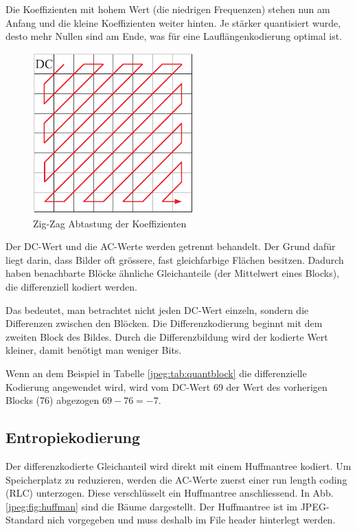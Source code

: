 Die Koeffizienten mit hohem Wert (die niedrigen Frequenzen) stehen nun am Anfang und die kleine Koeffizienten weiter hinten.
Je stärker quantisiert wurde, desto mehr Nullen sind am Ende, was für eine Lauflängenkodierung optimal ist.

\begin{figure}
    \centering
    \includegraphics[width=62mm]{papers/jpeg/pictures/zigzag.pdf}
    \caption{Zig-Zag Abtastung der Koeffizienten
        \label{jpeg:fig:zigzag}}
\end{figure}

Der DC-Wert und die AC-Werte werden getrennt behandelt.
Der Grund dafür liegt darin, dass Bilder oft grössere, fast gleichfarbige Flächen besitzen.
Dadurch haben benachbarte Blöcke ähnliche Gleichanteile (der Mittelwert eines Blocks), die differenziell kodiert werden.

Das bedeutet, man betrachtet nicht jeden DC-Wert einzeln, sondern die Differenzen zwischen den Blöcken.
Die Differenzkodierung beginnt mit dem zweiten Block des Bildes.
Durch die Differenzbildung wird der kodierte Wert kleiner, damit benötigt man weniger Bits.

Wenn an dem Beispiel in Tabelle \ref{jpeg:tab:quantblock} die differenzielle Kodierung angewendet wird, wird vom DC-Wert 69 der Wert des vorherigen Blocks (76) abgezogen \(69-76 = -7\).

\subsection{Entropiekodierung
\label{jpeg:subsection:entropiekodierung}}
Der differenzkodierte Gleichanteil wird direkt mit einem Huffmantree kodiert.
Um Speicherplatz zu reduzieren, werden die AC-Werte zuerst einer run length coding (RLC) unterzogen.
Diese verschlüsselt ein Huffmantree anschliessend.
In Abb. \ref{jpeg:fig:huffman} sind die Bäume dargestellt.
Der Huffmantree ist im JPEG-Standard nich vorgegeben und muss deshalb im File header hinterlegt werden.

